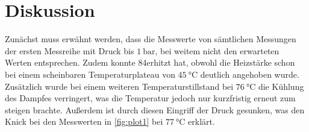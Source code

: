 \section{Diskussion}
\label{sec:Diskussion}
Zunächst muss erwähnt werden, dass die Messwerte von sämtlichen Messungen der ersten Messreihe mit Druck bis $\SI{1}{\bar}$, bei weitem nicht den erwarteten Werten entsprechen. Zudem konnte
84erhitzt hat, obwohl die Heizstärke schon bei einem scheinbaren Temperaturplateau von $\SI{45}{\celsius}$ deutlich angehoben wurde. Zusätzlich wurde bei einem weiteren Temperaturstillstand bei $\SI{76}{\celsius}$
die Kühlung des Dampfes verringert, was die Temperatur jedoch nur kurzfristig erneut zum steigen brachte. Außerdem ist durch diesen Eingriff der Druck gesunken, was den Knick bei
den Messwerten in \autoref{fig:plot1} bei $\SI{77}{\celsius}$ erklärt.